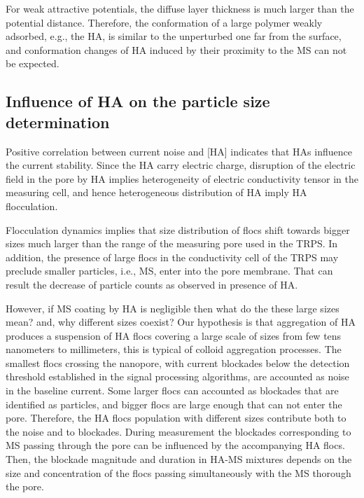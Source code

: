 \documentclass[journal=langd5,manuscript=article]{achemso}
\begin{document}
For weak attractive potentials, the diffuse layer thickness is much larger than the potential distance. Therefore, the conformation of a large  polymer weakly adsorbed, e.g., the HA, is similar to the unperturbed one far from the surface\cite{Netz2003}, and conformation changes of HA induced by their proximity to the MS can not be expected.



\subsection{Influence of HA on the particle size determination}


Positive correlation between current noise and [HA] indicates that HAs influence the current stability.  Since the HA carry electric charge, disruption of the electric field in the pore by HA implies  heterogeneity of electric conductivity tensor in the measuring cell, and hence heterogeneous distribution of HA imply HA flocculation. 

Flocculation dynamics implies that  size distribution of flocs shift towards bigger sizes much larger than the range of the measuring pore used in the TRPS. In addition, the presence of large flocs in the conductivity cell of the TRPS may preclude smaller particles, i.e., MS, enter into the pore membrane. That can result the  decrease of particle counts as observed in presence of HA.





However, if MS coating by HA is negligible then what do the these large sizes mean? and, why different sizes coexist?
Our hypothesis is that aggregation of HA produces  a suspension of HA flocs covering a large scale of sizes from few tens nanometers to millimeters, this is typical of colloid aggregation processes.  The smallest flocs crossing the nanopore, with current blockades below the  detection threshold established in the signal processing algorithms, are accounted as noise in the baseline current. Some larger flocs can accounted as blockades that are identified as particles, and bigger flocs are large enough that can not enter the pore.
Therefore, the HA flocs population with different sizes contribute both to the noise and to blockades.
During measurement the blockades corresponding to MS passing through the pore can be  influenced by the accompanying HA flocs. Then, the blockade magnitude and duration in HA-MS mixtures depends on the size and concentration of the flocs passing simultaneously with the MS thorough the pore.
\end{document}
